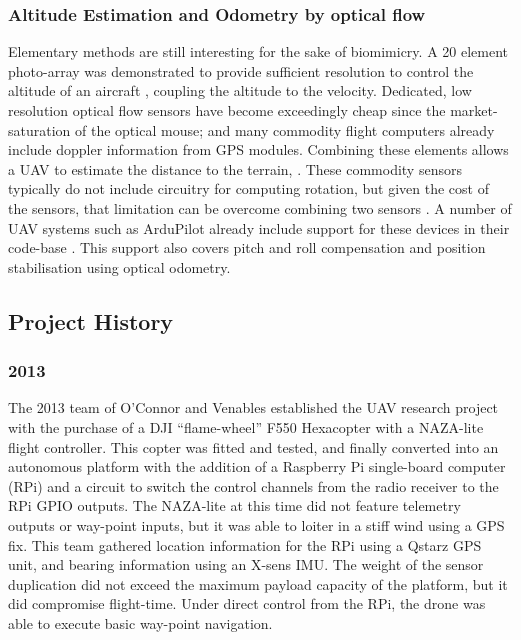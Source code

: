 \documentclass{article}
\begin{document}
      \subsubsection{Altitude Estimation and Odometry by optical flow}
        Elementary methods are still interesting for the sake of biomimicry.  A 20 element photo-array was demonstrated to provide sufficient resolution to control the altitude of an aircraft \cite{optoAlt}, coupling the altitude to the velocity.
        Dedicated, low resolution optical flow sensors have become exceedingly cheap since the market-saturation of the optical mouse; and many commodity flight computers already include doppler information from GPS modules. 
        Combining these elements allows a UAV to estimate the distance to the terrain, \cite{RemTerrain}.  These commodity sensors typically do not include circuitry for computing rotation, but given the cost of the sensors, that limitation can be overcome combining two sensors \cite{FlowRot}.
        A number of UAV systems such as ArduPilot already include support for these devices in their code-base \cite{ArduFlow}.
        This support also covers pitch and roll compensation and position stabilisation using optical odometry.


    \subsection{Project History}

      \subsubsection{2013}
        The 2013 team of O'Connor \cite{OConnor} and Venables \cite{Venables} established the UAV research project with the purchase of a DJI ``flame-wheel'' F550 Hexacopter with a NAZA-lite flight controller.  This copter was fitted and tested, and finally converted into an autonomous platform with the addition of a Raspberry Pi single-board computer (RPi) and a circuit to switch the control channels from the radio receiver to the RPi GPIO outputs.
        The NAZA-lite at this time did not feature telemetry outputs or way-point inputs, but it was able to loiter in a stiff wind using a GPS fix.
        This team gathered location information for the RPi using a Qstarz GPS unit, and bearing information using an X-sens IMU.  The weight of the sensor duplication did not exceed the maximum payload capacity of the platform, but it did compromise flight-time.
        Under direct control from the RPi, the drone was able to execute basic way-point navigation.
\end{document}
